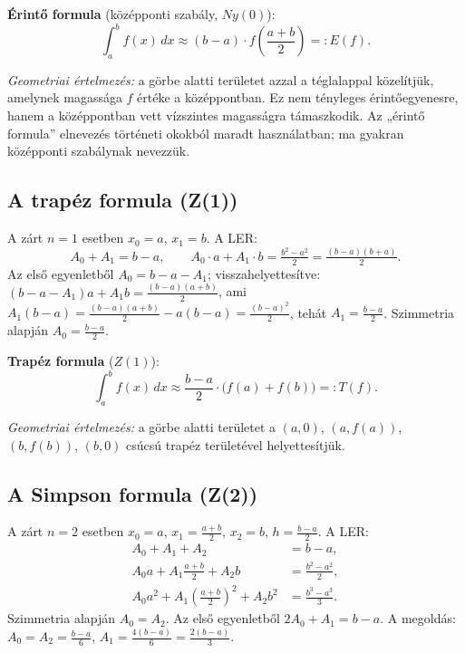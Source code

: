 \documentclass[a4paper,12pt]{article}
\theoremstyle{mydef}
\begin{document}
\begin{mdframed}[backgroundcolor=thmbg,linewidth=0pt,innertopmargin=8pt,innerbottommargin=8pt]
\textbf{Érintő formula} (középponti szabály, $Ny(0)$):
\[
  \int_a^b f(x)\,dx \approx (b-a)\cdot f\!\left(\frac{a+b}{2}\right) =: E(f).
\]
\end{mdframed}

\emph{Geometriai értelmezés:} a görbe alatti területet azzal a téglalappal közelítjük,
amelynek magassága $f$ értéke a középpontban. Ez nem tényleges érintőegyenesre, hanem
a középpontban vett vízszintes magasságra támaszkodik. Az „érintő formula” elnevezés
történeti okokból maradt használatban; ma gyakran középponti szabálynak nevezzük.

\subsection*{A trapéz formula (Z(1))}

A zárt $n=1$ esetben $x_0 = a$, $x_1 = b$.
A LER:
\[
  A_0 + A_1 = b - a, \qquad A_0 \cdot a + A_1 \cdot b = \tfrac{b^2-a^2}{2} = \tfrac{(b-a)(b+a)}{2}.
\]
Az első egyenletből $A_0 = b-a-A_1$; visszahelyettesítve: $(b-a-A_1)a + A_1 b = \tfrac{(b-a)(a+b)}{2}$,
ami $A_1(b-a) = \tfrac{(b-a)(a+b)}{2} - a(b-a) = \tfrac{(b-a)^2}{2}$, tehát $A_1 = \tfrac{b-a}{2}$.
Szimmetria alapján $A_0 = \tfrac{b-a}{2}$.

\begin{mdframed}[backgroundcolor=thmbg,linewidth=0pt,innertopmargin=8pt,innerbottommargin=8pt]
\textbf{Trapéz formula} ($Z(1)$):
\[
  \int_a^b f(x)\,dx \approx \frac{b-a}{2}\cdot\bigl(f(a) + f(b)\bigr) =: T(f).
\]
\end{mdframed}

\emph{Geometriai értelmezés:} a görbe alatti területet a $(a,0)$, $(a,f(a))$, $(b,f(b))$,
$(b,0)$ csúcsú trapéz területével helyettesítjük.

\subsection*{A Simpson formula (Z(2))}

A zárt $n=2$ esetben $x_0=a$, $x_1=\tfrac{a+b}{2}$, $x_2=b$, $h=\tfrac{b-a}{2}$.
A LER:
\begin{align*}
  A_0 + A_1 + A_2 &= b - a, \\
  A_0 a + A_1 \tfrac{a+b}{2} + A_2 b &= \tfrac{b^2-a^2}{2}, \\
  A_0 a^2 + A_1 \left(\tfrac{a+b}{2}\right)^2 + A_2 b^2 &= \tfrac{b^3-a^3}{3}.
\end{align*}
Szimmetria alapján $A_0 = A_2$. Az első egyenletből $2A_0 + A_1 = b-a$.
A megoldás: $A_0 = A_2 = \tfrac{b-a}{6}$, $A_1 = \tfrac{4(b-a)}{6} = \tfrac{2(b-a)}{3}$.
\end{document}
